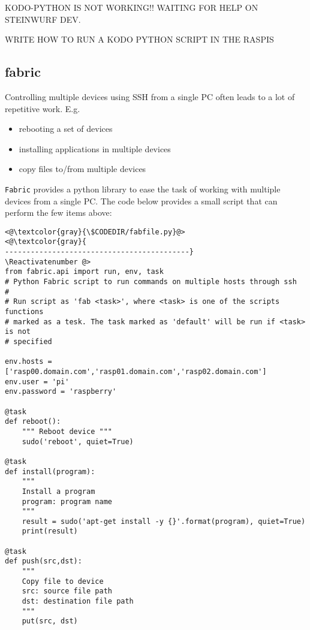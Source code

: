 KODO-PYTHON IS NOT WORKING!! WAITING FOR HELP ON STEINWURF DEV.

WRITE HOW TO RUN A KODO PYTHON SCRIPT IN THE RASPIS

\subsection{fabric}

Controlling multiple devices using \ac{SSH} from a single \ac{PC}
often leads to a lot of repetitive work. E.g.

\begin{itemize}
    \item rebooting a set of devices
    \item installing applications in multiple devices
    \item copy files to/from multiple devices
\end{itemize}

\texttt{Fabric} provides a python library to ease the task of working
with multiple devices from a single \ac{PC}. The code below provides
a small script that can perform the few items above:



\Suppressnumber\begin{lstlisting}[]
<@\textcolor{gray}{\$CODEDIR/fabfile.py}@>
<@\textcolor{gray}{
-------------------------------------------}
\Reactivatenumber @>
from fabric.api import run, env, task
# Python Fabric script to run commands on multiple hosts through ssh
#
# Run script as 'fab <task>', where <task> is one of the scripts functions
# marked as a tesk. The task marked as 'default' will be run if <task> is not
# specified

env.hosts = ['rasp00.domain.com','rasp01.domain.com','rasp02.domain.com']
env.user = 'pi'
env.password = 'raspberry'

@task
def reboot():
    """ Reboot device """
    sudo('reboot', quiet=True)

@task
def install(program):
    """
    Install a program
    program: program name
    """
    result = sudo('apt-get install -y {}'.format(program), quiet=True)
    print(result)

@task
def push(src,dst):
    """
    Copy file to device
    src: source file path
    dst: destination file path
    """
    put(src, dst)

\end{lstlisting}
\FloatBarrier

